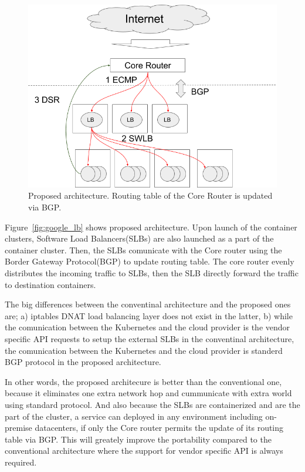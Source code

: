 \begin{figure}
\includegraphics[width=\columnwidth]{Figs/new_lb}
\caption{Proposed architecture. Routing table of the Core Router is updated via BGP.}
\label{fig:new_lb}
\end{figure}

Figure~\ref{fig:google_lb} shows proposed architecture.
Upon launch of the container clusters, Software Load Balancers(SLBs) are also launched as a part of the container cluster.
Then, the SLBs comunicate with the Core router using the Border Gateway Protocol(BGP)\cite{rekhter2005border} to update routing table.
The core router evenly distributes the incoming traffic to SLBs, then the SLB directly forward the traffic to destination containers.

The big differences between the conventinal architecture and the proposed ones are;
a) iptables DNAT load balancing layer does not exist in the latter,
b) while the comunication between the Kubernetes and the cloud provider is the vendor specific API requests to setup the external SLBs in the conventinal architecture, the comunication between the Kubernetes and the cloud provider is standerd BGP protocol in the proposed architecture.

In other words, the proposed architecure is better than the conventional one, because it eliminates one extra network hop and cummunicate with extra world using standard protocol.
And also because the SLBs are containerized and are the part of the cluster, a service can deployed in any environment including on-premise datacenters, if only the Core router permits the update of its routing table via BGP.
This will greately improve the portability compared to the conventional architecture where the support for vendor specific API is always required.

